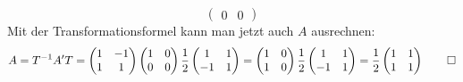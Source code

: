\begin{loesung}
\begin{teilaufgaben}
\[\begin{pmatrix}
0&0
\end{pmatrix}
\]
Mit der Transformationsformel kann man jetzt auch $A$ ausrechnen:
\[
A=T^{-1}A'T
=
\begin{pmatrix}
1&-1\\
1&1
\end{pmatrix}
\begin{pmatrix}
1&0\\
0&0
\end{pmatrix}
\frac12\begin{pmatrix}
1&1\\
-1&1
\end{pmatrix}
=
\begin{pmatrix}1&0\\1&0\end{pmatrix}
\frac12\begin{pmatrix}
1&1\\
-1&1
\end{pmatrix}
=
\frac12
\begin{pmatrix}
1&1\\
1&1
\end{pmatrix}
\qedhere
\]
\end{teilaufgaben}
\end{loesung}

